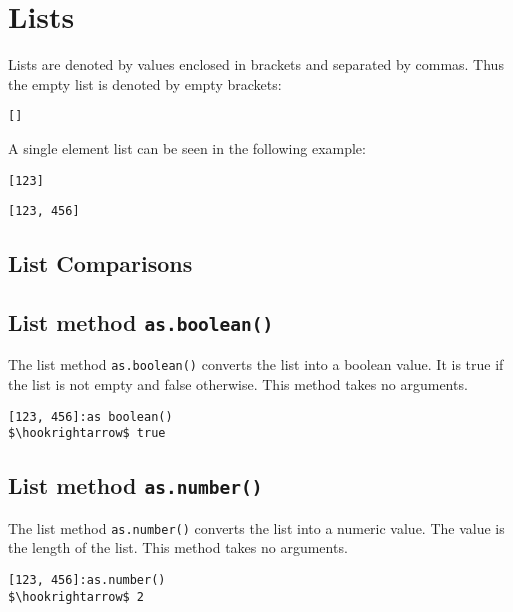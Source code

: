 \documentclass[11pt,a4paper]{scrbook}
\newcommand\method[1]{\texttt{#1}}
\begin{document}

\section{Lists}

Lists are denoted by values enclosed in brackets and separated by commas.
Thus the empty list is denoted by empty brackets:

\begin{lstlisting}[language=BibTool,mathescape=true]
[]
\end{lstlisting}

A single element list can be seen in the following example:

\begin{lstlisting}[language=BibTool,mathescape=true]
[123]
\end{lstlisting}

\begin{lstlisting}[language=BibTool,mathescape=true]
[123, 456]
\end{lstlisting}


\subsection{List Comparisons}



\subsection{List method \method{as.boolean()}}

The list method \method{as.boolean()} converts the list into a boolean value.
It is true if the list is not empty and false otherwise. This method takes no
arguments.

\begin{lstlisting}[language=BibTool,mathescape=true]
[123, 456]:as boolean()
$\hookrightarrow$ true
\end{lstlisting}

\subsection{List method \method{as.number()}}

The list method \method{as.number()} converts the list into a numeric value.
The value is the length of the list. This method takes no arguments.

\begin{lstlisting}[language=BibTool,mathescape=true]
[123, 456]:as.number()
$\hookrightarrow$ 2
\end{lstlisting}
\end{document}
